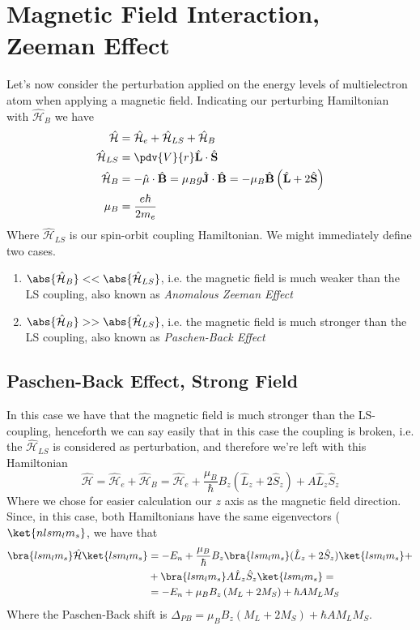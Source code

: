 \documentclass[a4paper, 11pt]{book}
\renewcommand{\vec}[1]{\mathbf{#1}}
\newcommand{\1}{\opr{\mathds{1}}}
\newcommand{\ham}{\mathcal{H}}
\newcommand{\opr}[1]{\hat{#1}}
\newcommand{\vecopr}[1]{\opr{\vec{#1}}}
\theoremstyle{plain}
\begin{document}
	\section{Magnetic Field Interaction, Zeeman Effect}
	Let's now consider the perturbation applied on the energy levels of multielectron atom when applying a magnetic field. Indicating our perturbing Hamiltonian with $\opr{\ham}_B$ we have
	\begin{equation}
		\begin{aligned}
			\opr{\ham}&=\opr{\ham}_e+\opr{\ham}_{LS}+\opr{\ham}_B\\
			\opr{\ham}_{LS}&=\pdv{V}{r}\vecopr{L}\cdot\vecopr{S}\\
			\opr{\ham}_{B}&=-\vecopr{\mu}\cdot\vecopr{B}=\mu_Bg\vecopr{J}\cdot\vecopr{B}=-\mu_B\vecopr{B}\left( \vecopr{L}+2\vecopr{S} \right)\\
			\mu_B&=\frac{e\hbar}{2m_e}
		\end{aligned}
		\label{eq:totalzeemanhammultielec}
	\end{equation}
	Where $\opr{\ham}_{LS}$ is our spin-orbit coupling Hamiltonian. We might immediately define two cases.
	\begin{enumerate}
	\item $\abs{\opr{\ham}_B}<<\abs{\opr{\ham}_{LS}}$, i.e. the magnetic field is much weaker than the LS coupling, also known as \textit{Anomalous Zeeman Effect}
	\item $\abs{\opr{\ham}_B}>>\abs{\opr{\ham}_{LS}}$, i.e. the magnetic field is much stronger than the LS coupling, also known as \textit{Paschen-Back Effect}
	\end{enumerate}
	\subsection{Paschen-Back Effect, Strong Field}
	In this case we have that the magnetic field is much stronger than the LS-coupling, henceforth we can say easily that in this case the coupling is broken, i.e. the $\opr{\ham}_{LS}$ is considered as perturbation, and therefore we're left with this Hamiltonian
	\begin{equation}
		\opr{\ham}=\opr{\ham}_e+\opr{\ham}_B=\opr{\ham}_e+\frac{\mu_B}{\hbar}B_z(\opr{L}_z+2\opr{S}_z)+A\opr{L}_z\opr{S}_z
		\label{eq:paschenbackmultielec}
	\end{equation}
	Where we chose for easier calculation our $z$ axis as the magnetic field direction. Since, in this case, both Hamiltonians have the same eigenvectors ($\ket{nlsm_lm_s}$, we have that
	\begin{equation}
		\begin{aligned}
			\bra{lsm_lm_s}\opr{\ham}\ket{lsm_lm_s}&=-E_n+\frac{\mu_B}{\hbar}B_z\bra{lsm_lm_s}(\opr{L}_z+2\opr{S}_z)\ket{lsm_lm_s}+\\
			&+\bra{lsm_lm_s}A\opr{L}_z\opr{S}_z\ket{lsm_lm_s}=\\
			&=-E_n+\mu_BB_z\left( M_L+2M_S \right)+\hbar AM_LM_S
		\end{aligned}
		\label{eq:shiftpaschenback}
	\end{equation}
	Where the Paschen-Back shift is $\Delta_{PB}=\mu_BB_z(M_L+2M_S)+\hbar AM_LM_S$.\\
\end{document}
